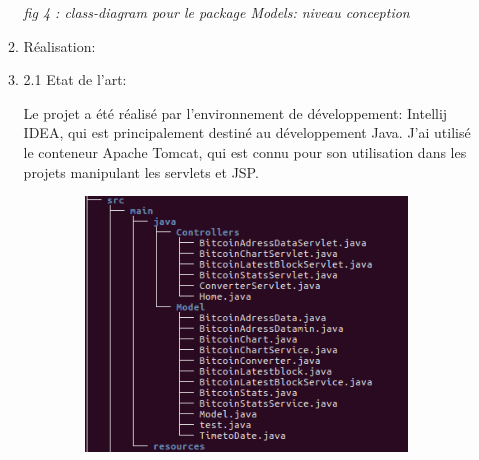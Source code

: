 \documentclass[12pt]{article}
\begin{document}
\begin{enumerate}
\begin{enumerate}
\vspace{\baselineskip}

\vspace{\baselineskip}

\vspace{\baselineskip}
\textit{fig 4 : class-diagram pour le package Models: niveau conception}\par


\vspace{\baselineskip}

\vspace{\baselineskip}

\vspace{\baselineskip}
	\item Réalisation:\par

	\item 2.1 Etat de l’art:\par

\tab Le projet a été réalisé par l’environnement de développement: Intellij IDEA, qui est principalement destiné au développement Java. J’ai utilisé le conteneur Apache Tomcat, qui est connu pour son utilisation dans les projets manipulant les servlets et JSP.\par





\begin{figure}[H]
	\begin{Center}
		\includegraphics[width=3.81in,height=2.67in]{./media/image6.png}
	\end{Center}
\end{figure}




\par


\vspace{\baselineskip}


\end{enumerate}
\end{enumerate}
\end{document}
